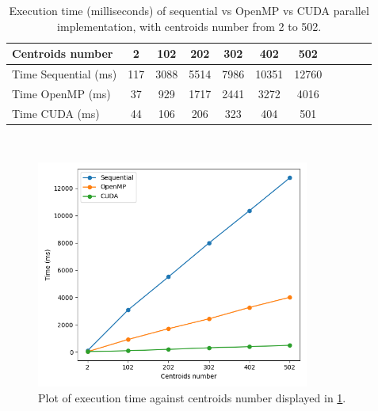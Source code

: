 \documentclass[10pt,twocolumn,letterpaper]{article}
\begin{document}
\clearpage
\begin{table}[h]
	\centering
	\begin{tabular}{|l|c|c|c|c|c|c|c|c|c|c|}
		\hline
		Centroids number   & 2    & 102    & 202    & 302    & 402    & 502   \\ \hline
		Time Sequential (ms) & 117 & 3088 & 5514 & 7986 & 10351 & 12760  \\ \hline
		Time OpenMP (ms)     & 37 & 929 & 1717 & 2441 & 3272 & 4016  \\ \hline
		Time CUDA (ms)       & 44 & 106 & 206 & 323 & 404 & 501 \\ \hline
	\end{tabular}\\
	\bigskip
	\caption{Execution time (milliseconds) of sequential vs OpenMP vs CUDA parallel implementation, with centroids number from 2 to 502.}
	\label{table:time_to_centroids}
\end{table}
\begin{figure}[h]
	\begin{center}
		\includegraphics[width=0.8\textwidth]{img/time_to_centroids_n.png}
	\end{center}
	\caption{Plot of execution time against centroids number displayed in \cref{table:time_to_centroids}.}
	\label{fig:time_to_centroids}
\end{figure}
\end{document}
